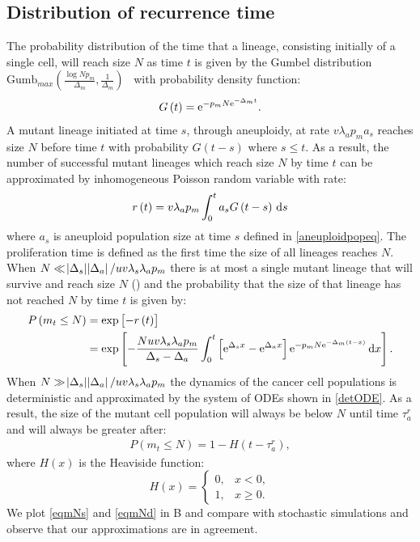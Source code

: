 \documentclass[12pt]{extarticle}
\renewcommand{\d}[1]{\ensuremath{\operatorname{d}\!{#1}}}
\renewcommand{\d}{{\rm d}}
\newcommand{\e}{{\rm e}}
\begin{document}
\begin{appendices}
\section{Distribution of recurrence time}
The probability distribution of the time that a lineage, consisting initially of a single cell, will reach size $N$ as time $t$ is given by the Gumbel distribution $\text{Gumb}_{max}\left(\frac{\log Np_m}{\Delta_m},\frac{1}{\Delta_m}\right)$~\citep{avanzini2019cancer} with probability density function:
\begin{align*}
G\left(t\right)=\e^{-p_mN\e^{-\Delta_mt}}.
\end{align*}
A mutant lineage initiated at time $s$, through aneuploidy, at rate $v\lambda_ap_ma_s$ reaches size $N$ before time $t$ with probability $G\left(t-s\right)$ where $s\leq t$. As a result, the number of successful mutant lineages which reach size $N$ by time $t$ can be approximated by inhomogeneous Poisson random variable with rate:
\begin{align*}
r\left(t\right)=v\lambda_ap_m\int_0^t a_sG\left(t-s\right)\,\d s
\end{align*}
where $a_s$ is aneuploid population size at time $s$ defined in \cref{aneuploidpopeq}. The proliferation time is defined as the first time the size of all lineages reaches $N$. When $N\ll\abs{\Delta_s}\abs{\Delta_a}/uv\lambda_s\lambda_ap_m$ there is at most a single mutant lineage that will survive and reach size $N$ () and the probability that the size of that lineage has not reached $N$ by time $t$ is given by:
\begin{align}\nonumber
P\left(m_t\leq N\right)&=\exp\left[-r\left(t\right)\right]\\ \label{eqmNs}
&=\exp\left[-\frac{Nuv\lambda_s\lambda_ap_m}{\Delta_s-\Delta_a}\int_0^t\left[\e^{\Delta_sx}-\e^{\Delta_ax}\right]\e^{-p_mN\e^{-\Delta_m\left(t-x\right)}}\,\d x\right].
\end{align}
When $N\gg\abs{\Delta_s}\abs{\Delta_a}/uv\lambda_s\lambda_ap_m$ the dynamics of the cancer cell populations is deterministic and approximated by the system of ODEs shown in \cref{detODE}. As a result, the size of the mutant cell population will always be below $N$ until time $\tau_a^r$ and will always be greater after:
\begin{align}\label{eqmNd}
P\left(m_t\leq N\right)=1-H\left(t-\tau_a^r\right),
\end{align}
where $H(x)$ is the Heaviside function:
\begin{equation*}
H\left(x\right) = \begin{cases}
    0 ,&
  x<0 ,\\ 
  1 ,&
  x\geq0 .
  \end{cases}
\end{equation*}
We plot \cref{eqmNs} and \cref{eqmNd} in B and compare with stochastic simulations and observe that our approximations are in agreement. %


\end{appendices}
\end{document}

